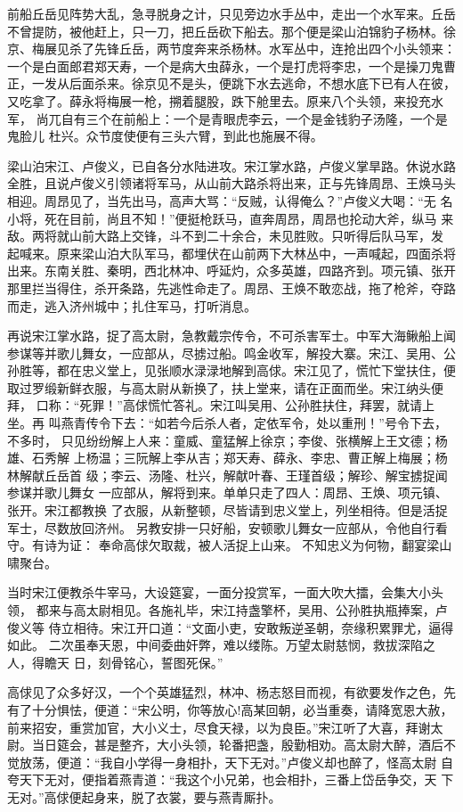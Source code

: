 前船丘岳见阵势大乱，急寻脱身之计，只见旁边水手丛中，走出一个水军来。丘岳
不曾提防，被他赶上，只一刀，把丘岳砍下船去。那个便是梁山泊锦豹子杨林。徐
京、梅展见杀了先锋丘岳，两节度奔来杀杨林。水军丛中，连抢出四个小头领来：
一个是白面郎君郑天寿，一个是病大虫薛永，一个是打虎将李忠，一个是操刀鬼曹
正，一发从后面杀来。徐京见不是头，便跳下水去逃命，不想水底下已有人在彼，
又吃拿了。薛永将梅展一枪，搠着腿股，跌下舱里去。原来八个头领，来投充水军，
尚兀自有三个在前船上：一个是青眼虎李云，一个是金钱豹子汤隆，一个是鬼脸儿
杜兴。众节度使便有三头六臂，到此也施展不得。

梁山泊宋江、卢俊义，已自各分水陆进攻。宋江掌水路，卢俊义掌旱路。休说水路
全胜，且说卢俊义引领诸将军马，从山前大路杀将出来，正与先锋周昂、王焕马头
相迎。周昂见了，当先出马，高声大骂：“反贼，认得俺么？”卢俊义大喝：“无
名小将，死在目前，尚且不知！”便挺枪跃马，直奔周昂，周昂也抡动大斧，纵马
来敌。两将就山前大路上交锋，斗不到二十余合，未见胜败。只听得后队马军，发
起喊来。原来梁山泊大队军马，都埋伏在山前两下大林丛中，一声喊起，四面杀将
出来。东南关胜、秦明，西北林冲、呼延灼，众多英雄，四路齐到。项元镇、张开
那里拦当得住，杀开条路，先逃性命走了。周昂、王焕不敢恋战，拖了枪斧，夺路
而走，逃入济州城中；扎住军马，打听消息。

再说宋江掌水路，捉了高太尉，急教戴宗传令，不可杀害军士。中军大海鳅船上闻
参谋等并歌儿舞女，一应部从，尽掳过船。鸣金收军，解投大寨。宋江、吴用、公
孙胜等，都在忠义堂上，见张顺水渌渌地解到高俅。宋江见了，慌忙下堂扶住，便
取过罗缎新鲜衣服，与高太尉从新换了，扶上堂来，请在正面而坐。宋江纳头便拜，
口称：“死罪！”高俅慌忙答礼。宋江叫吴用、公孙胜扶住，拜罢，就请上坐。再
叫燕青传令下去：“如若今后杀人者，定依军令，处以重刑！”号令下去，不多时，
只见纷纷解上人来：童威、童猛解上徐京；李俊、张横解上王文德；杨雄、石秀解
上杨温；三阮解上李从吉；郑天寿、薛永、李忠、曹正解上梅展；杨林解献丘岳首
级；李云、汤隆、杜兴，解献叶春、王瑾首级；解珍、解宝掳捉闻参谋并歌儿舞女
一应部从，解将到来。单单只走了四人：周昂、王焕、项元镇、张开。宋江都教换
了衣服，从新整顿，尽皆请到忠义堂上，列坐相待。但是活捉军士，尽数放回济州。
另教安排一只好船，安顿歌儿舞女一应部从，令他自行看守。有诗为证：
奉命高俅欠取裁，被人活捉上山来。
不知忠义为何物，翻宴梁山啸聚台。

当时宋江便教杀牛宰马，大设筵宴，一面分投赏军，一面大吹大擂，会集大小头领，
都来与高太尉相见。各施礼毕，宋江持盏擎杯，吴用、公孙胜执瓶捧案，卢俊义等
侍立相待。宋江开口道：“文面小吏，安敢叛逆圣朝，奈缘积累罪尤，逼得如此。
二次虽奉天恩，中间委曲奸弊，难以缕陈。万望太尉慈悯，救拔深陷之人，得瞻天
日，刻骨铭心，誓图死保。”

高俅见了众多好汉，一个个英雄猛烈，林冲、杨志怒目而视，有欲要发作之色，先
有了十分惧怯，便道：“宋公明，你等放心!高某回朝，必当重奏，请降宽恩大赦，
前来招安，重赏加官，大小义士，尽食天禄，以为良臣。”宋江听了大喜，拜谢太
尉。当日筵会，甚是整齐，大小头领，轮番把盏，殷勤相劝。高太尉大醉，酒后不
觉放荡，便道：“我自小学得一身相扑，天下无对。”卢俊义却也醉了，怪高太尉
自夸天下无对，便指着燕青道：“我这个小兄弟，也会相扑，三番上岱岳争交，天
下无对。”高俅便起身来，脱了衣裳，要与燕青厮扑。

